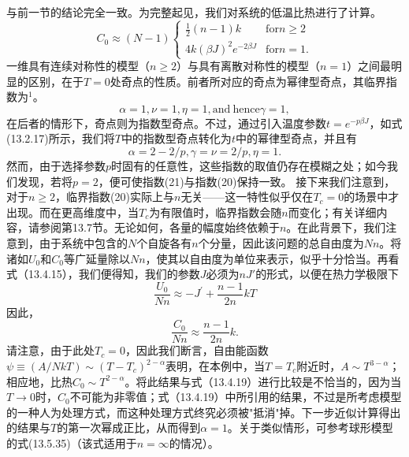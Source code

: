 与前一节的结论完全一致。为完整起见，我们对系统的低温比热进行了计算。
\begin{equation}\tag{13.1.76}\label{eq:13.1.76}
C _ { 0 } \approx ( N - 1 ) \left\{ \begin{array}{ll} { \frac { 1 } { 2 } ( n - 1 ) k } & {  \mathrm { f o r }  n \geq 2 } \\{ 4 k ( \beta J ) ^{2} e ^{- 2 \beta J} } & {  \mathrm { f o r }  n = 1 . } \end{array} \right.
\end{equation}
一维具有连续对称性的模型（\(n \geq 2\)）与具有离散对称性的模型（\(n=1\)）之间最明显的区别，在于\(T=0\)处奇点的性质。前者所对应的奇点为幂律型奇点，其临界指数为\(^{1}\)。
\begin{equation}\tag{13.1.77}\label{eq:13.1.77}
\alpha = 1 ,  \nu = 1 ,  \eta = 1 ,  \mathrm { a n d ~ h e n c e }  \gamma = 1 ,
\end{equation}
在后者的情形下，奇点则为指数型奇点。不过，通过引入温度参数\(t = e^{-p\beta J}\)，如式(13.2.17)所示，我们将\(T\)中的指数型奇点转化为\(t\)中的幂律型奇点，并且有
\begin{equation}\tag{13.1.78}\label{eq:13.1.78}
\alpha = 2 - 2 / p ,  \gamma = \nu = 2 / p ,  \eta = 1 .
\end{equation}
然而，由于选择参数\(p\)时固有的任意性，这些指数的取值仍存在模糊之处；如今我们发现，若将\(p=2\)，便可使指数(21)与指数(20)保持一致。
接下来我们注意到，对于\(n \geq 2\)，临界指数(20)实际上与\(n\)无关——这一特性似乎仅在\(T_c = 0\)的场景中才出现。而在更高维度中，当\(T_c\)为有限值时，临界指数会随\(n\)而变化；有关详细内容，请参阅第13.7节。无论如何，各量的幅度始终依赖于\(n\)。在此背景下，我们注意到，由于系统中包含的\(N\)个自旋各有\(n\)个分量，因此该问题的总自由度为\(Nn\)。将诸如\(U_0\)和\(C_0\)等广延量除以\(Nn\)，使其以自由度为单位来表示，似乎十分恰当。再看式（13.4.15），我们便得知，我们的参数\(J\)必须为\(nJ'\)的形式，以便在热力学极限下
\begin{equation}\tag{13.1.79}\label{eq:13.1.79}
\frac { U _ { 0 } } { N n } \approx - J ^{\prime} + \frac { n - 1 } { 2 n } k T
\end{equation}
因此，
\begin{equation}\tag{13.1.80}\label{eq:13.1.80}
\frac { C _ { 0 } } { N n } \approx \frac { n - 1 } { 2 n } k .
\end{equation}
请注意，由于此处\(T_{c}=0\)，因此我们断言，自由能函数\(\psi\equiv(A/NkT)\sim(T-T_{c})^{2-\alpha}\)表明，在本例中，当\(T=T_{c}\)附近时，\(A\sim T^{3-\alpha}\)；相应地，比热\(C_{0}\sim T^{2-\alpha}\)。将此结果与式（13.4.19）进行比较是不恰当的，因为当\(T\to0\)时，\(C_{0}\)不可能为非零值；式（13.4.19）中所引用的结果，不过是所考虑模型的一种人为处理方式，而这种处理方式终究必须被"抵消"掉。下一步近似计算得出的结果与\(T\)的第一次幂成正比，从而得到\(\alpha=1\)。关于类似情形，可参考球形模型的式(13.5.35)（该式适用于\(n=\infty\)的情况）。
